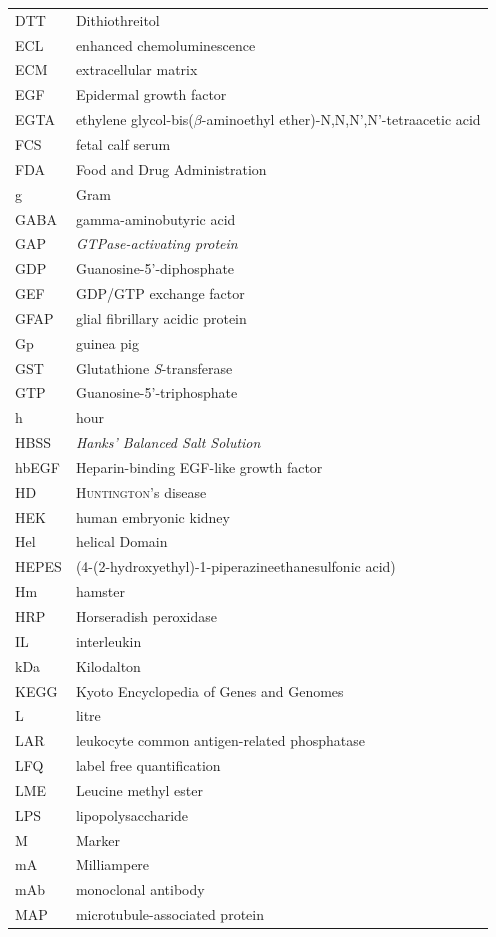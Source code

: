 \documentclass[a4paper,11pt,bibtotocnumbered]{article}
\begin{document}
\begin{small}
\begin{longtabu}{p{3cm}X}
DTT & Dithiothreitol\\
ECL& enhanced chemoluminescence\\
ECM&extracellular matrix\\
EGF&Epidermal growth factor\\
EGTA& ethylene glycol-bis($\beta$-aminoethyl ether)-N,N,N',N'-tetraacetic acid\\
FCS & fetal calf serum \\
FDA&Food and Drug Administration\\
g  & Gram\\
GABA& gamma-aminobutyric acid\\
GAP& \textit{GTPase-activating protein}\\
GDP& Guanosine-5'-diphosphate\\
GEF& GDP/GTP exchange factor\\
GFAP&glial fibrillary acidic protein\\
Gp& guinea pig\\
GST&Glutathione \textit{S}-transferase\\ 
GTP& Guanosine-5'-triphosphate\\
h & hour\\
HBSS & \textit{Hanks' Balanced Salt Solution} \\
hbEGF&Heparin-binding EGF-like growth factor\\
HD&\textsc{Huntington}'s disease\\
HEK & human embryonic kidney \\
Hel& helical Domain\\
HEPES&(4-(2-hydroxyethyl)-1-piperazineethanesulfonic acid)\\
Hm&hamster\\
HRP &Horseradish peroxidase\\
IL&interleukin\\
kDa & Kilodalton\\
KEGG&Kyoto Encyclopedia of Genes and Genomes\\
L & litre\\
LAR& leukocyte common antigen-related phosphatase\\
LFQ&label free quantification\\
LME & Leucine methyl ester \\
LPS&lipopolysaccharide\\
M & Marker\\
mA & Milliampere\\
mAb& monoclonal antibody\\
MAP&microtubule-associated protein\\

\end{longtabu}
\end{small}
\end{document}
